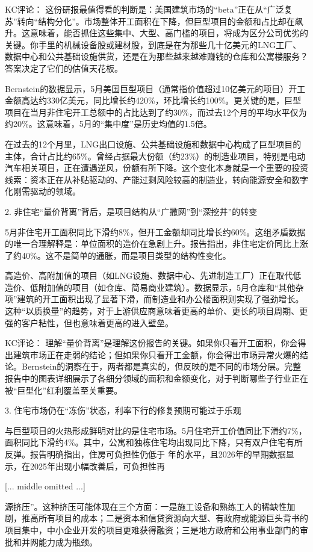 \documentclass[11pt]{ctexart}
\begin{document}
KC评论： 这份研报最值得看的判断是：美国建筑市场的“beta”正在从“广泛复苏”转向“结构分化”。市场整体开工面积在下降，但巨型项目的金额和占比却在飙升。这意味着，能否抓住这些集中、大型、高门槛的项目，将成为区分公司优劣的关键。你手里的机械设备股或建材股，到底是在为那些几十亿美元的LNG工厂、数据中心和公共基础设施供货，还是在为那些越来越难赚钱的仓库和公寓楼服务？答案决定了它们的估值天花板。

Bernstein的数据显示，5月美国巨型项目（通常指价值超过10亿美元的项目）开工金额高达约330亿美元，同比增长约420\%，环比增长约100\%。更关键的是，巨型项目在当月非住宅开工总额中的占比达到了约30\%，而过去12个月的平均水平仅为约20\%。这意味着，5月的“集中度”是历史均值的1.5倍。

在过去的12个月里，LNG出口设施、公共基础设施和数据中心构成了巨型项目的主体，合计占比约65\%。曾经占据最大份额（约23\%）的制造业项目，特别是电动汽车相关项目，正在遭遇逆风，份额有所下降。这个变化本身就是一个重要的投资线索：资本正在从补贴驱动的、产能过剩风险较高的制造业，转向能源安全和数字化刚需驱动的领域。

2. 非住宅“量价背离”背后，是项目结构从“广撒网”到“深挖井”的转变

5月非住宅开工面积同比下滑约8\%，但开工金额却同比增长约60\%。这组矛盾数据的唯一合理解释是：单位面积的造价在急剧上升。报告指出，非住宅定价同比上涨了约40\%。这不是简单的通胀，而是项目类型的结构性变化。

高造价、高附加值的项目（如LNG设施、数据中心、先进制造工厂）正在取代低造价、低附加值的项目（如仓库、简易商业建筑）。数据显示，5月仓库和“其他杂项”建筑的开工面积出现了显著下滑，而制造业和办公楼面积则实现了强劲增长。这种“以质换量”的趋势，对于上游供应商意味着更高的单价、更长的项目周期、更强的客户粘性，但也意味着更高的进入壁垒。

KC评论： 理解“量价背离”是理解这份报告的关键。如果你只看开工面积，你会得出建筑市场正在走弱的结论；但如果你只看开工金额，你会得出市场异常火爆的结论。Bernstein的洞察在于，两者都是真实的，但反映的是不同的市场分层。完整报告中的图表详细展示了各细分领域的面积和金额变化，对于判断哪些子行业正在被“巨型化”红利覆盖至关重要。

3. 住宅市场仍在“冻伤”状态，利率下行的修复预期可能过于乐观

与巨型项目的火热形成鲜明对比的是住宅市场。5月住宅开工价值同比下滑约7\%，面积同比下滑约4\%。其中，公寓和独栋住宅均出现同比下降，只有双户住宅有所反弹。报告明确指出，住房可负担性仍低于 年的水平，且2026年的早期数据显示，在2025年出现小幅改善后，可负担性再

[... middle omitted ...]

源挤压”。这种挤压可能体现在三个方面：一是施工设备和熟练工人的稀缺性加剧，推高所有项目的成本；二是资本和信贷资源向大型、有政府或能源巨头背书的项目集中，中小企业开发的项目更难获得融资；三是地方政府和公用事业部门的审批和并网能力成为瓶颈。
\end{document}
